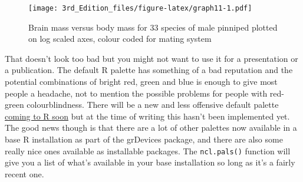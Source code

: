 \documentclass[
]{book}
\begin{document}
\begin{figure}
\centering
\texttt{[image: 3rd\_Edition\_files/figure-latex/graph11-1.pdf]}
\caption{\label{fig:graph11}Brain mass versus body mass for 33 species of male pinniped plotted on log scaled axes, colour coded for mating system}
\end{figure}

That doesn't look too bad but you might not want to use it for a presentation or a publication. The default R palette has something of a bad reputation and the potential combinations of bright red, green and blue is enough to give most people a headache, not to mention the possible problems for people with red-green colourblindness. There will be a new and less offensive default palette \href{https://developer.r-project.org/Blog/public/2019/11/21/a-new-palette-for-r/index.html}{coming to R soon} but at the time of writing this hasn't been implemented yet. The good news though is that there are a lot of other palettes now available in a base R installation as part of the grDevices package, and there are also some really nice ones available as installable packages. The \texttt{ncl.pals()} function will give you a list of what's available in your base installation so long as it's a fairly recent one.
\end{document}
